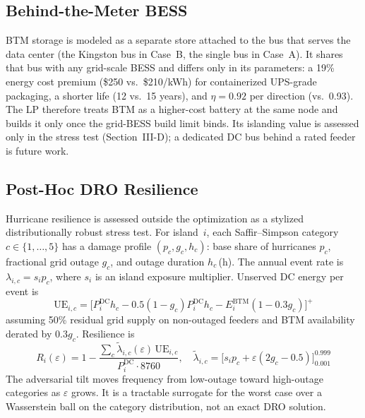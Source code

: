 \documentclass[conference,10pt]{IEEEtran}
\begin{document}
\subsection{Behind-the-Meter BESS}

BTM storage is modeled as a separate store attached to the bus that serves the data center (the Kingston bus in Case~B, the single bus in Case~A). It shares that bus with any grid-scale BESS and differs only in its parameters: a 19\% energy cost premium (\$250 vs.\ \$210/kWh) for containerized UPS-grade packaging, a shorter life (12 vs.\ 15 years), and $\eta=0.92$ per direction (vs.\ 0.93). The LP therefore treats BTM as a higher-cost battery at the same node and builds it only once the grid-BESS build limit binds. Its islanding value is assessed only in the stress test (Section~III-D); a dedicated DC bus behind a rated feeder is future work.

\subsection{Post-Hoc DRO Resilience}

Hurricane resilience is assessed outside the optimization as a stylized distributionally robust stress test. For island~$i$, each Saffir--Simpson category $c\in\{1,\dots,5\}$ has a damage profile $(p_c, g_c, h_c)$: base share of hurricanes $p_c$, fractional grid outage $g_c$, and outage duration $h_c$\,(h). The annual event rate is $\lambda_{i,c}=s_i p_c$, where $s_i$ is an island exposure multiplier. Unserved DC energy per event is
\begin{equation}
\text{UE}_{i,c}=\bigl[P_i^{\text{DC}}h_c-0.5(1-g_c)P_i^{\text{DC}}h_c-E_i^{\text{BTM}}(1-0.3g_c)\bigr]^{+}
\label{eq:ue}
\end{equation}
assuming 50\% residual grid supply on non-outaged feeders and BTM availability derated by $0.3g_c$. Resilience is
\begin{equation}
R_i(\varepsilon) = 1 - \frac{\sum_c \tilde{\lambda}_{i,c}(\varepsilon)\,\text{UE}_{i,c}}{P_i^{\text{DC}} \cdot 8760},\quad \tilde{\lambda}_{i,c}=\bigl[s_i p_c+\varepsilon(2g_c-0.5)\bigr]_{0.001}^{0.999}
\label{eq:dro}
\end{equation}
The adversarial tilt moves frequency from low-outage toward high-outage categories as $\varepsilon$ grows. It is a tractable surrogate for the worst case over a Wasserstein ball on the category distribution, not an exact DRO solution.
\end{document}
